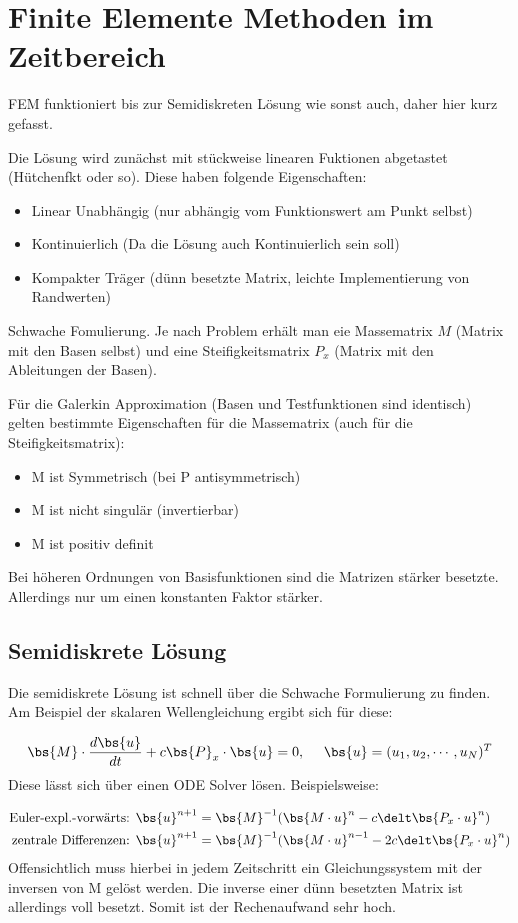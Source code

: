 \section{Finite Elemente Methoden im Zeitbereich}
FEM funktioniert bis zur Semidiskreten L\"osung wie sonst auch, daher hier kurz gefasst.
\par
Die L\"osung wird zun\"achst mit st\"uckweise linearen Fuktionen abgetastet (H\"utchenfkt oder so). Diese haben folgende Eigenschaften:
\par
\begin{itemize}
	\item Linear Unabh\"angig (nur abh\"angig vom Funktionswert am Punkt selbst)
	\item Kontinuierlich (Da die L\"osung auch Kontinuierlich sein soll)
	\item Kompakter Tr\"ager (d\"unn besetzte Matrix, leichte Implementierung von Randwerten)
\end{itemize}
Schwache Fomulierung. Je nach Problem erh\"alt man eie Massematrix $M$ (Matrix mit den Basen selbst) und eine Steifigkeitsmatrix $P_x$ (Matrix mit den Ableitungen der Basen).
\par
F\"ur die Galerkin Approximation (Basen und Testfunktionen sind identisch) gelten bestimmte Eigenschaften f\"ur die Massematrix (auch f\"ur die Steifigkeitsmatrix):
\par
\begin{itemize}
	\item M ist Symmetrisch (bei P antisymmetrisch)
	\item M ist nicht singul\"ar (invertierbar) 
	\item M ist positiv definit
\end{itemize}
Bei h\"oheren Ordnungen von Basisfunktionen sind die Matrizen st\"arker besetzte. Allerdings nur um einen konstanten Faktor st\"arker.

\subsection{Semidiskrete L\"osung}
Die semidiskrete L\"osung ist schnell \"uber die Schwache Formulierung zu finden. Am Beispiel der skalaren Wellengleichung ergibt sich f\"ur diese:
\par
\begin{equation*}
	\bs{M}\cdot\frac{d\bs{u}}{dt} + c\bs{P}_x\cdot\bs{u}=0,~~~~\bs{u} = (u_1,u_2,\cdots,u_N)^T
\end{equation*}
Diese l\"asst sich \"uber einen ODE Solver l\"osen. Beispielsweise:
\par
\begin{align*}
	\textrm{Euler-expl.-vorw\"arts: }\bs{u}^{n+1} &= \bs{M}^{-1}(\bs{M\cdot u}^n - c\delt\bs{P_x\cdot u}^n)\\
	\textrm{zentrale Differenzen: }\bs{u}^{n+1} &= \bs{M}^{-1}(\bs{M\cdot u}^{n-1} - 2c\delt\bs{P_x\cdot u}^n)
\end{align*}
Offensichtlich muss hierbei in jedem Zeitschritt ein Gleichungssystem mit der inversen von M gel\"ost werden. Die inverse einer d\"unn besetzten Matrix ist allerdings voll besetzt. Somit ist der Rechenaufwand sehr hoch.

